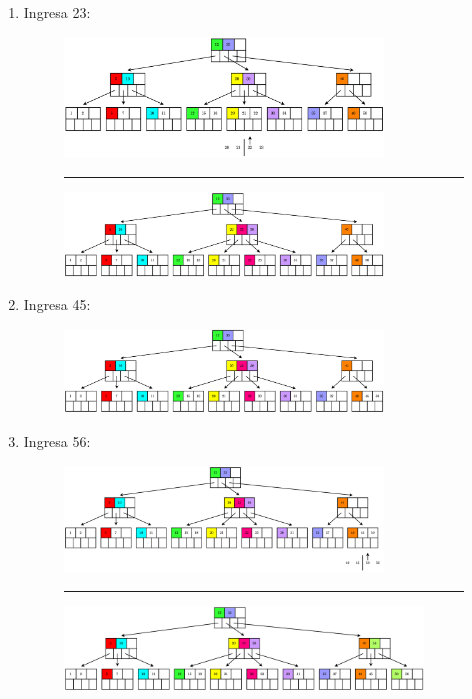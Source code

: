 \documentclass{templateNote}
\begin{document}
\begin{itemize}
\begin{enumerate}
\begin{enumerate}
\begin{enumerate}
                \newpage
                \item Ingresa 23:
                \begin{figure}[H]
                    \centering
                    \includegraphics[width=0.8\textwidth]{diagram/P3-1-19-1.png}
                    \rule{\textwidth}{1pt}
                    \includegraphics[width=0.8\textwidth]{diagram/P3-1-19-2.png}
                \end{figure}

                \item Ingresa 45:
                \begin{figure}[H]
                    \centering
                    \includegraphics[width=0.8\textwidth]{diagram/P3-1-20.png}
                \end{figure}

                \item Ingresa 56:
                \begin{figure}[H]
                    \centering
                    \includegraphics[width=0.8\textwidth]{diagram/P3-1-21-1.png}
                    \rule{\textwidth}{1pt}
                    \includegraphics[width=0.9\textwidth]{diagram/P3-1-21-2.png}
                \end{figure}


\end{enumerate}
\end{enumerate}
\end{enumerate}
\end{itemize}
\end{document}
